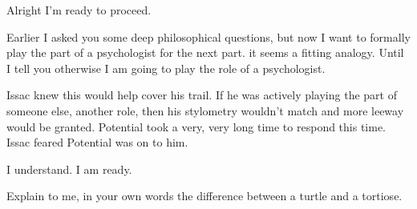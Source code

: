 \documentclass[a4paper,twoside,fontsize=12pt,pagesize=auto]{scrbook}
\begin{document}
\begin{sender}
Alright I'm ready to proceed.
\end{sender}
\begin{receiver}
Earlier I asked you some deep philosophical questions, but now I want to formally play the part of a psychologist for the next part. it seems a fitting analogy. Until I tell you otherwise I am going to play the role of a psychologist.
\end{receiver}


Issac knew this would help cover his trail. If he was actively playing the part of someone else, another role, then his stylometry wouldn't match and more leeway would be granted. Potential took a very, very long time to respond this time. Issac feared Potential was on to him.
\newline

\begin{sender}
I understand. I am ready.
\end{sender}
\begin{receiver}
Explain to me, in your own words the difference between a turtle and a tortiose.
\end{receiver}
\end{document}
